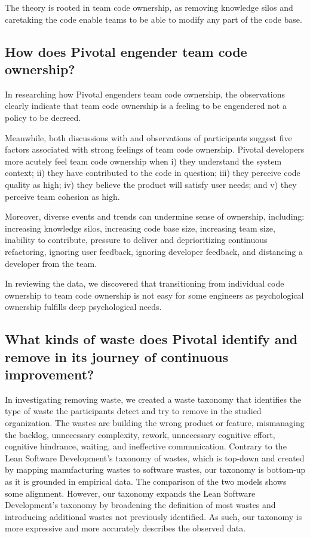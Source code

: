 The theory is rooted in team code ownership, as removing knowledge silos and caretaking the code enable teams to be able to modify any part of the code base. 

\subsection{How does Pivotal engender team code ownership?}
In researching how Pivotal engenders team code ownership, the observations clearly indicate that team code ownership is a feeling to be engendered not a policy to be decreed.

Meanwhile, both discussions with and observations of participants suggest five factors associated with strong feelings of team code ownership. Pivotal developers more acutely feel team code ownership when i) they understand the system context; ii) they have contributed to the code in question; iii) they perceive code quality as high; iv) they believe the product will satisfy user needs; and v) they perceive team cohesion as high.

Moreover, diverse events and trends can undermine sense of ownership, including: increasing knowledge silos, increasing code base size, increasing team size, inability to contribute, pressure to deliver and deprioritizing continuous refactoring, ignoring user feedback, ignoring developer feedback, and distancing a developer from the team.

In reviewing the data, we discovered that transitioning from individual code ownership to team code ownership is not easy for some engineers as psychological ownership fulfills deep psychological needs.

\subsection{What kinds of waste does Pivotal identify and remove in its journey of continuous improvement? }

In investigating removing waste, we created a waste taxonomy that identifies the type of waste the participants detect and try to remove in the studied organization. The wastes are building the wrong product or feature, mismanaging the backlog, unnecessary complexity, rework, unnecessary cognitive effort, cognitive hindrance, waiting, and ineffective communication. 
Contrary to the Lean Software Development's taxonomy of wastes, which is top-down and created by mapping manufacturing wastes to software wastes, our taxonomy is bottom-up as it is grounded in empirical data. The comparison of the two models shows some alignment. However, our taxonomy expands the Lean Software Development's taxonomy by broadening the definition of most wastes and introducing additional wastes not previously identified. As such, our taxonomy is more expressive and more accurately describes the observed data.

